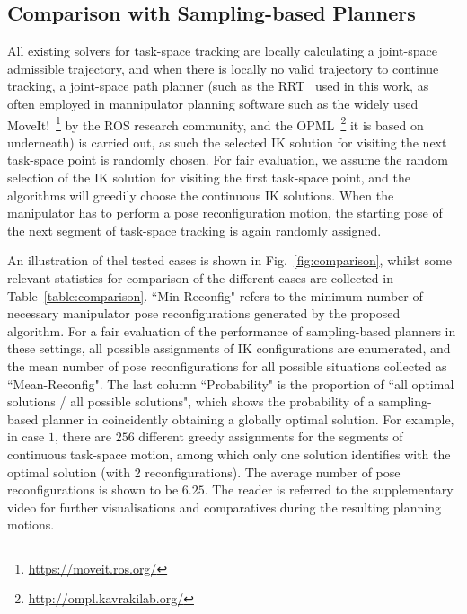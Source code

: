 \documentclass[letterpaper, 10 pt, conference]{ieeeconf}  %
\begin{document}
\subsection{Comparison with  Sampling-based Planners}\label{section:comparison}
All existing solvers for task-space tracking are locally calculating a joint-space admissible trajectory, and when there is locally no valid trajectory to continue tracking, a joint-space path planner (such as the RRT~\cite{Lavalle2006Planning} used in this work, as often employed in mannipulator planning software such as the widely used  MoveIt!~\footnote{\url{https://moveit.ros.org/}} by the ROS research community, %
and the OPML~\footnote{\url{http://ompl.kavrakilab.org/}} %
it is based on underneath) is carried out, as such the selected IK solution for visiting the next task-space point is randomly chosen. 
For fair evaluation, we assume the random selection of the IK solution for visiting the first task-space point, and the algorithms will greedily choose the continuous IK solutions. 
When the manipulator has to perform a pose reconfiguration motion, the starting pose of the next segment of task-space tracking is again randomly assigned. 

An illustration of thel tested cases is shown in Fig.~\ref{fig:comparison}, whilst some relevant statistics for comparison of the  different cases are collected in Table~\ref{table:comparison}. 
``Min-Reconfig"  refers to the minimum number of necessary manipulator pose reconfigurations generated by the proposed algorithm. 
For a fair evaluation of the performance of sampling-based planners in these settings, all possible assignments of IK configurations are enumerated, and the mean number of pose reconfigurations for all possible situations collected as ``Mean-Reconfig". 
The last column ``Probability" is the proportion of ``all optimal solutions / all possible solutions", which shows the probability of a sampling-based planner in coincidently obtaining a globally optimal solution. 
For example, in case $1$, there are $256$ different greedy assignments for the segments of continuous task-space motion, among which only one solution identifies with the optimal solution (with 2 reconfigurations). The average number of pose reconfigurations is shown to be $6.25$. The reader is referred to the supplementary video for further visualisations and comparatives during the resulting planning motions. 
\end{document}
